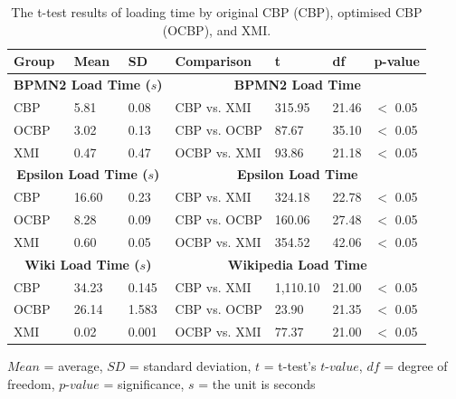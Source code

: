 {  \begin{table}[ht]
    \footnotesize
    \centering
    \caption{The t-test results of loading time by original CBP (CBP), optimised CBP (OCBP), and XMI.}
    \label{table:ttest_results_loadtime}
    \begin{tabular}
      {|p{}p{}p{}|p{}p{}p{}p{}|}
      \hline
      Group & Mean & SD & Comparison & t & df & p-value \\
      \hline
      \multicolumn{3}{|c|}{\textbf{BPMN2 Load Time ($s$)}} & \multicolumn{4}{c|}{\textbf{BPMN2 Load Time}} \\
      CBP & 5.81 & 0.08 & CBP vs. XMI & 315.95 &21.46 & $<$ 0.05 \\
      OCBP & 3.02 & 0.13 & CBP vs. OCBP & 87.67 & 35.10 & $<$ 0.05 \\
      XMI & 0.47 & 0.47 & OCBP vs. XMI & 93.86 & 21.18 & $<$ 0.05 \\
      \hline
      
      \multicolumn{3}{|c|}{\textbf{Epsilon Load Time ($s$)}} & \multicolumn{4}{c|}{\textbf{Epsilon Load Time}} \\
      CBP & 16.60 & 0.23 & CBP vs. XMI & 324.18 &22.78 & $<$ 0.05 \\
      OCBP & 8.28 & 0.09 & CBP vs. OCBP & 160.06 & 27.48 & $<$ 0.05 \\
      XMI & 0.60 & 0.05 & OCBP vs. XMI & 354.52 &42.06 & $<$ 0.05 \\
      \hline
      
      \multicolumn{3}{|c|}{\textbf{Wiki Load Time ($s$)}} & \multicolumn{4}{c|}{\textbf{Wikipedia Load Time}} \\
      CBP & 34.23 & 0.145 & CBP vs. XMI & 1,110.10 &21.00 & $<$ 0.05 \\
      OCBP & 26.14 & 1.583 & CBP vs. OCBP & 23.90 &21.35 & $<$ 0.05 \\
      XMI & 0.02 & 0.001 & OCBP vs. XMI & 77.37 & 21.00 & $<$ 0.05 \\
      \hline
    \end{tabular}
    \justify
    $Mean$ = average, $SD$ = standard deviation, $t$ = t-test’s $t$-$value$, $df$ = degree of freedom, $p$-$value$ = significance, $s$ = the unit is seconds
  \end{table}
  
}
